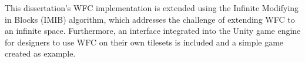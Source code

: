 This dissertation's WFC implementation is extended using the Infinite Modifying in Blocks (IMIB) algorithm, which addresses the challenge of extending WFC to an infinite space. Furthermore, an interface integrated into the Unity game engine for designers to use WFC on their own tilesets is included and a simple game created as example.

\begin{figure}[H]
    \centering
    \hfill
    
    \vspace{\baselineskip} %
    

\end{figure}
